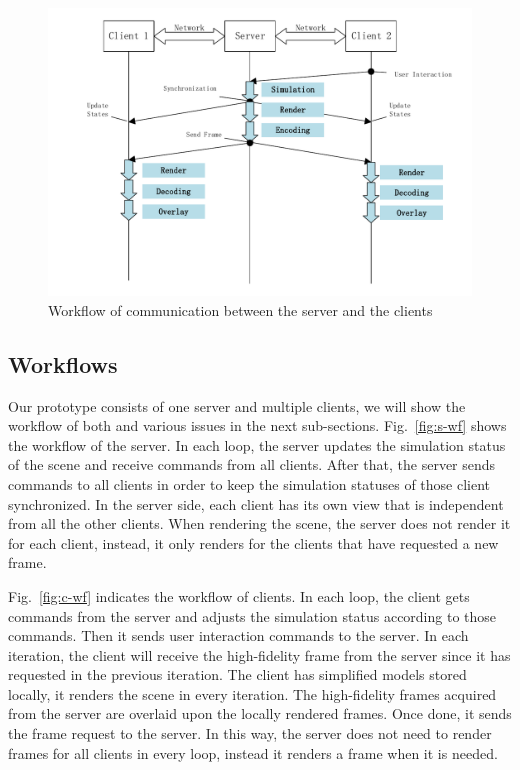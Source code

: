 \begin{figure}[!htbp]
	\centering
	\includegraphics[width=\columnwidth]{figures/sequence_workflow.pdf}
	\caption{Workflow of communication between the server and the clients}
	\label{fig:swf}
\end{figure}

\subsection{Workflows}

Our prototype consists of one server and multiple clients, we will show the workflow of both and various issues in the next sub-sections.
Fig.~\ref{fig:s-wf} shows the workflow of the server.
In each loop, the server updates the simulation status of the scene and receive commands from all clients.
After that, the server sends commands to all clients in order to keep the simulation statuses of those client synchronized.
In the server side, each client has its own view that is independent from all the other clients.
When rendering the scene, the server does not render it for each client, instead, it only renders for the clients that have requested a new frame.

Fig.~\ref{fig:c-wf} indicates the workflow of clients. In each loop, the client gets commands from the server and adjusts the simulation status according to those commands. Then it sends user interaction commands to the server. In each iteration, the client will receive the high-fidelity frame from the server since it has requested in the previous iteration. The client has simplified models stored locally, it renders the scene in every iteration. The high-fidelity frames acquired from the server are overlaid upon the locally rendered frames. Once done, it sends the frame request to the server. In this way, the server does not need to render frames for all clients in every loop, instead it renders a frame when it is needed.

